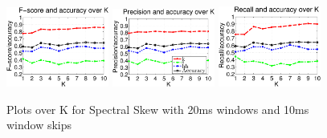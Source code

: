 	
\begin{figure}


	\centering\includegraphics[width=0.3\textwidth]{sskew2010FP.png}
	\centering\includegraphics[width=0.3\textwidth]{sskew2010_P.png}
	\centering\includegraphics[width=0.3\textwidth]{sskew2010_R.png}
	
	\caption{Plots over K for Spectral Skew with 20ms windows and 10ms window skips}
\end{figure}

